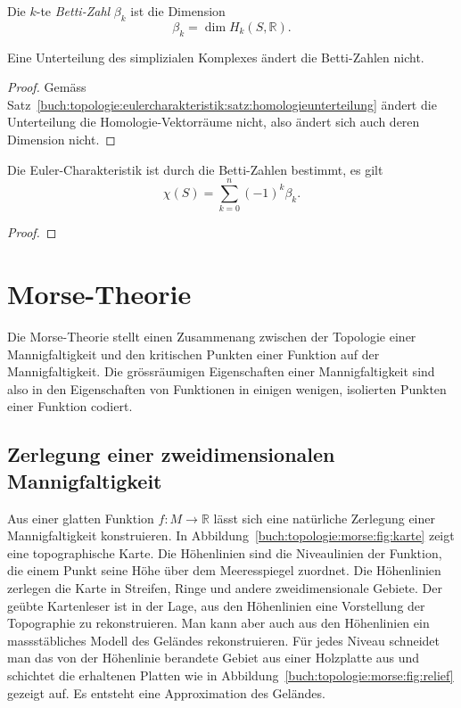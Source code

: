 \begin{definition}
Die $k$-te \emph{Betti-Zahl} $\beta_k$ ist die Dimension
\[
\beta_k
=
\dim H_k(S,\mathbb{R}).
\]
\end{definition}

\begin{satz}
Eine Unterteilung des simplizialen Komplexes ändert die Betti-Zahlen
nicht.
\end{satz}

\begin{proof}
Gemäss Satz~\ref{buch:topologie:eulercharakteristik:satz:homologieunterteilung}
ändert die Unterteilung die Homologie-Vektorräume nicht, also ändert sich
auch deren Dimension nicht.
\end{proof}

\begin{satz}
Die Euler-Charakteristik ist durch die Betti-Zahlen bestimmt,
es gilt
\[
\chi(S)
=
\sum_{k=0}^n (-1)^k \beta_k.
\]
\end{satz}

\begin{proof}
\end{proof}

%
%
\section{Morse-Theorie}
Die Morse-Theorie stellt einen Zusammenang zwischen der Topologie einer 
Mannigfaltigkeit und den kritischen Punkten einer Funktion auf der
Mannigfaltigkeit.
Die grössräumigen Eigenschaften einer Mannigfaltigkeit sind also
in den Eigenschaften von Funktionen in einigen wenigen, isolierten
Punkten einer Funktion codiert.




%
%
\subsection{Zerlegung einer zweidimensionalen Mannigfaltigkeit}
%
%
Aus einer glatten Funktion $f\colon M\to\mathbb{R}$ lässt
sich eine natürliche Zerlegung einer Mannigfaltigkeit konstruieren.
In Abbildung~\ref{buch:topologie:morse:fig:karte} zeigt eine 
topographische Karte.
Die Höhenlinien sind die Niveaulinien der Funktion, die einem
Punkt seine Höhe über dem Meeresspiegel zuordnet.
Die Höhenlinien zerlegen die Karte in Streifen, Ringe und andere
zweidimensionale Gebiete.
Der geübte Kartenleser ist in der Lage, aus den Höhenlinien eine
Vorstellung der Topographie zu rekonstruieren.
Man kann aber auch aus den Höhenlinien ein massstäbliches Modell
des Geländes rekonstruieren.
Für jedes Niveau schneidet man das von der Höhenlinie berandete Gebiet
aus einer Holzplatte aus und schichtet die erhaltenen Platten
wie in Abbildung~\ref{buch:topologie:morse:fig:relief} gezeigt
auf.
Es entsteht eine Approximation des Geländes.

